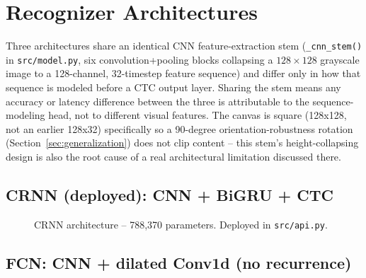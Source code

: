 \documentclass[11pt]{article}
\begin{document}
\section{Recognizer Architectures}

Three architectures share an identical CNN feature-extraction stem
(\texttt{\_cnn\_stem()} in \texttt{src/model.py}, six convolution+pooling blocks
collapsing a $128{\times}128$ grayscale image to a 128-channel, 32-timestep feature
sequence) and differ only in how that sequence is modeled before a CTC output layer.
Sharing the stem means any accuracy or latency difference between the three is
attributable to the sequence-modeling head, not to different visual features. The
canvas is square (128x128, not an earlier 128x32) specifically so a 90-degree
orientation-robustness rotation (Section~\ref{sec:generalization}) does not clip
content -- this stem's height-collapsing design is also the root cause of a real
architectural limitation discussed there.

\subsection{CRNN (deployed): CNN + BiGRU + CTC}

\begin{figure}[H]
\centering
{}
\caption{CRNN architecture -- 788,370 parameters. Deployed in \texttt{src/api.py}.}
\end{figure}

\subsection{FCN: CNN + dilated Conv1d (no recurrence)}
\end{document}
